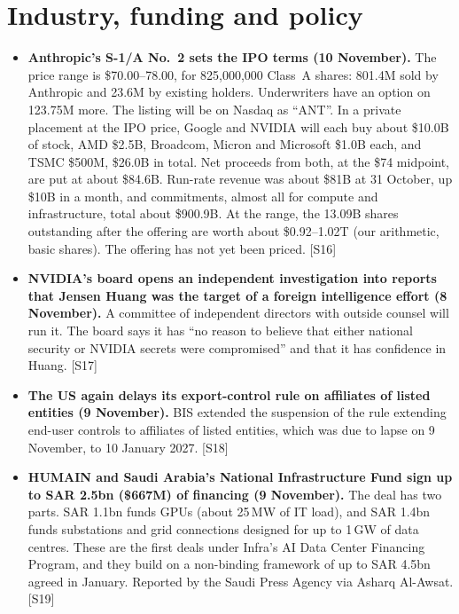 \documentclass[11pt,a4paper]{article}
\newcommand{\srcref}[1]{\textcolor{brandaccent}{[S#1]}}
\begin{document}
\section{Industry, funding and policy}

\begin{itemize}
  \item \textbf{Anthropic's S-1/A No.\ 2 sets the IPO terms (10 November).} The price range is \$70.00--78.00, for 825,000,000 Class~A shares: 801.4M sold by Anthropic and 23.6M by existing holders. Underwriters have an option on 123.75M more. The listing will be on Nasdaq as ``ANT''.
  In a private placement at the IPO price, Google and NVIDIA will each buy about \$10.0B of stock, AMD \$2.5B, Broadcom, Micron and Microsoft \$1.0B each, and TSMC \$500M, \$26.0B in total. Net proceeds from both, at the \$74 midpoint, are put at about \$84.6B.
  Run-rate revenue was about \$81B at 31 October, up \$10B in a month, and commitments, almost all for compute and infrastructure, total about \$900.9B. At the range, the 13.09B shares outstanding after the offering are worth about \$0.92--1.02T (our arithmetic, basic shares). The offering has not yet been priced. \srcref{16}
  \item \textbf{NVIDIA's board opens an independent investigation into reports that Jensen Huang was the target of a foreign intelligence effort (8 November).} A committee of independent directors with outside counsel will run it.
  The board says it has ``no reason to believe that either national security or NVIDIA secrets were compromised'' and that it has confidence in Huang. \srcref{17}
  \item \textbf{The US again delays its export-control rule on affiliates of listed entities (9 November).} BIS extended the suspension of the rule extending end-user controls to affiliates of listed entities, which was due to lapse on 9 November, to 10 January 2027. \srcref{18}
  \item \textbf{HUMAIN and Saudi Arabia's National Infrastructure Fund sign up to SAR 2.5bn (\$667M) of financing (9 November).} The deal has two parts. SAR 1.1bn funds GPUs (about 25\,MW of IT load), and SAR 1.4bn funds substations and grid connections designed for up to 1\,GW of data centres.
  These are the first deals under Infra's AI Data Center Financing Program, and they build on a non-binding framework of up to SAR 4.5bn agreed in January. Reported by the Saudi Press Agency via Asharq Al-Awsat. \srcref{19}
\end{itemize}
\end{document}
